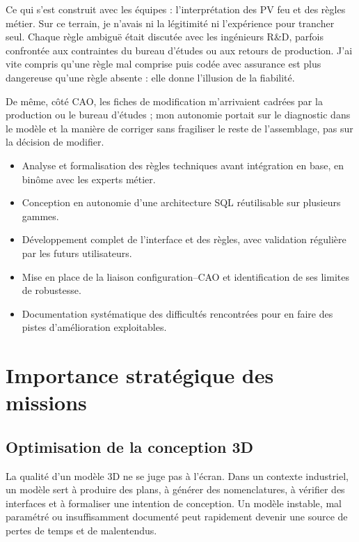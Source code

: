Ce qui s'est construit avec les équipes : l'interprétation des PV feu et des règles métier. Sur ce terrain, je n'avais ni la légitimité ni l'expérience pour trancher seul. Chaque règle ambiguë était discutée avec les ingénieurs R\&D, parfois confrontée aux contraintes du bureau d'études ou aux retours de production. J'ai vite compris qu'une règle mal comprise puis codée avec assurance est plus dangereuse qu'une règle absente : elle donne l'illusion de la fiabilité.

De même, côté CAO, les fiches de modification m'arrivaient cadrées par la production ou le bureau d'études ; mon autonomie portait sur le diagnostic dans le modèle et la manière de corriger sans fragiliser le reste de l'assemblage, pas sur la décision de modifier.

\begin{itemize}[leftmargin=1.4cm]
\item Analyse et formalisation des règles techniques avant intégration en base, en binôme avec les experts métier.
\item Conception en autonomie d'une architecture SQL réutilisable sur plusieurs gammes.
\item Développement complet de l'interface et des règles, avec validation régulière par les futurs utilisateurs.
\item Mise en place de la liaison configuration--CAO et identification de ses limites de robustesse.
\item Documentation systématique des difficultés rencontrées pour en faire des pistes d'amélioration exploitables.
\end{itemize}

\section{Importance stratégique des missions}

\subsection{Optimisation de la conception 3D}

La qualité d'un modèle 3D ne se juge pas à l'écran. Dans un contexte industriel, un modèle sert à produire des plans, à générer des nomenclatures, à vérifier des interfaces et à formaliser une intention de conception. Un modèle instable, mal paramétré ou insuffisamment documenté peut rapidement devenir une source de pertes de temps et de malentendus.

